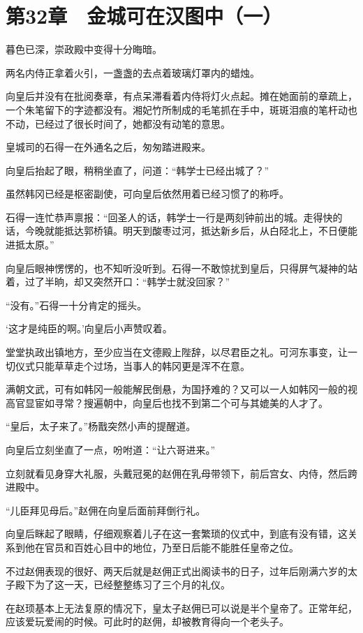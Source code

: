 \section{第32章　金城可在汉图中（一）}

暮色已深，崇政殿中变得十分晦暗。

两名内侍正拿着火引，一盏盏的去点着玻璃灯罩内的蜡烛。

向皇后并没有在批阅奏章，有点呆滞看着内侍将灯火点起。摊在她面前的章疏上，一个朱笔留下的字迹都没有。湘妃竹所制成的毛笔抓在手中，斑斑泪痕的笔杆动也不动，已经过了很长时间了，她都没有动笔的意思。

皇城司的石得一在外通名之后，匆匆踏进殿来。

向皇后抬起了眼，稍稍坐直了，问道：“韩学士已经出城了？”

虽然韩冈已经是枢密副使，可向皇后依然用着已经习惯了的称呼。

石得一连忙恭声禀报：“回圣人的话，韩学士一行是两刻钟前出的城。走得快的话，今晚就能抵达郭桥镇。明天到酸枣过河，抵达新乡后，从白陉北上，不日便能进抵太原。”

向皇后眼神愣愣的，也不知听没听到。石得一不敢惊扰到皇后，只得屏气凝神的站着，过了半晌，却又突然开口：“韩学士就没回家？”

“没有。”石得一十分肯定的摇头。

‘这才是纯臣的啊。’向皇后小声赞叹着。

堂堂执政出镇地方，至少应当在文德殿上陛辞，以尽君臣之礼。可河东事变，让一切仪式只能草草走个过场，当事人的韩冈更是浑不在意。

满朝文武，可有如韩冈一般能解民倒悬，为国抒难的？又可以一人如韩冈一般的视高官显宦如寻常？搜遍朝中，向皇后也找不到第二个可与其媲美的人才了。

“皇后，太子来了。”杨戬突然小声的提醒道。

向皇后立刻坐直了一点，吩咐道：“让六哥进来。”

立刻就看见身穿大礼服，头戴冠冕的赵佣在乳母带领下，前后宫女、内侍，然后跨进殿中。

“儿臣拜见母后。”赵佣在向皇后面前拜倒行礼。

向皇后眯起了眼睛，仔细观察着儿子在这一套繁琐的仪式中，到底有没有错，这关系到他在官员和百姓心目中的地位，乃至日后能不能胜任皇帝之位。

不过赵佣表现的很好、两天后就是赵佣正式出阁读书的日子，过年后刚满六岁的太子殿下为了这一天，已经整整练习了三个月的礼仪。

在赵顼基本上无法复原的情况下，皇太子赵佣已可以说是半个皇帝了。正常年纪，应该爱玩爱闹的时候。可此时的赵佣，却被教育得向一个老头子。


